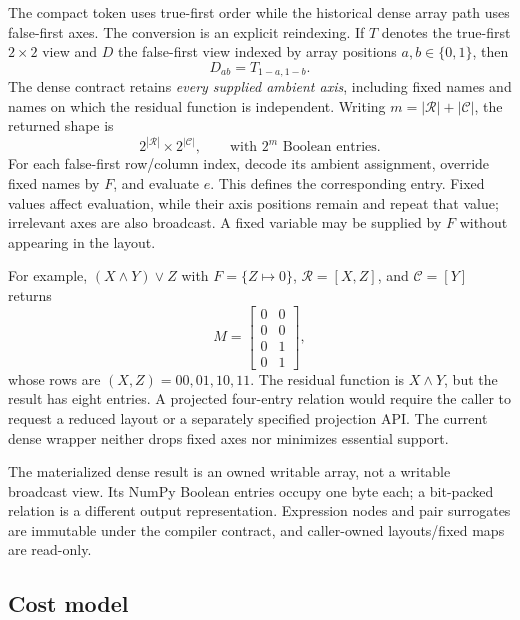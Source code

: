 \documentclass[10pt]{article}
\theoremstyle{plain}
\theoremstyle{definition}
\theoremstyle{remark}
\begin{document}
The compact token uses true-first order while the historical dense array path uses false-first axes. The conversion is an explicit reindexing. If $T$ denotes the true-first $2\times2$ view and $D$ the false-first view indexed by array positions $a,b\in\{0,1\}$, then
\begin{equation}
 D_{ab}=T_{1-a,1-b}.
 \label{eq:layout-conversion}
\end{equation}
The dense contract retains \emph{every supplied ambient axis}, including fixed names and names on which the residual function is independent. Writing $m=|\mathcal R|+|\mathcal C|$, the returned shape is
\begin{equation}
 2^{|\mathcal R|}\times2^{|\mathcal C|},\qquad\text{with }2^m\text{ Boolean entries}.
 \label{eq:ambient-shape}
\end{equation}
For each false-first row/column index, decode its ambient assignment, override fixed names by $F$, and evaluate $e$. This defines the corresponding entry. Fixed values affect evaluation, while their axis positions remain and repeat that value; irrelevant axes are also broadcast. A fixed variable may be supplied by $F$ without appearing in the layout.

For example, $(X\land Y)\lor Z$ with $F=\{Z\mapsto0\}$, $\mathcal R=[X,Z]$, and $\mathcal C=[Y]$ returns
\begin{equation}
 M=\begin{bmatrix}0&0\\0&0\\0&1\\0&1\end{bmatrix},
 \label{eq:fixed-axis-example}
\end{equation}
whose rows are $(X,Z)=00,01,10,11$. The residual function is $X\land Y$, but the result has eight entries. A projected four-entry relation would require the caller to request a reduced layout or a separately specified projection API. The current dense wrapper neither drops fixed axes nor minimizes essential support.

The materialized dense result is an owned writable array, not a writable broadcast view. Its NumPy Boolean entries occupy one byte each; a bit-packed relation is a different output representation. Expression nodes and pair surrogates are immutable under the compiler contract, and caller-owned layouts/fixed maps are read-only.

\subsection{Cost model}
\end{document}
